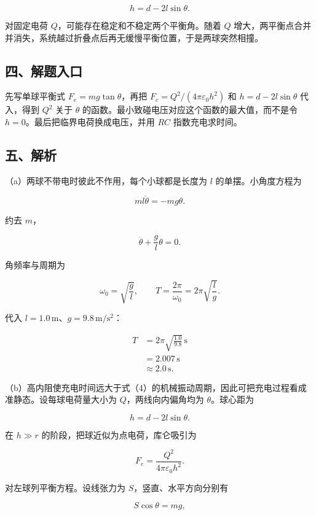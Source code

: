 \documentclass[12pt,a4paper,UTF8]{ctexart}
\begin{document}
\[
h=d-2l\sin\theta.
\]

对固定电荷 \(Q\)，可能存在稳定和不稳定两个平衡角。随着 \(Q\)
增大，两平衡点合并并消失，系统越过折叠点后再无缓慢平衡位置，于是两球突然相撞。

\subsection{四、解题入口}\label{ux56dbux89e3ux9898ux5165ux53e3-5}

先写单球平衡式 \(F_e=mg\tan\theta\)，再把
\(F_e=Q^2/(4\pi\varepsilon_0h^2)\) 和 \(h=d-2l\sin\theta\) 代入，得到
\(Q^2\) 关于 \(\theta\)
的函数。最小致碰电压对应这个函数的最大值，而不是令
\(h=0\)。最后把临界电荷换成电压，并用 \(RC\) 指数充电求时间。

\subsection{五、解析}\label{ux4e94ux89e3ux6790-5}

（a）两球不带电时彼此不作用，每个小球都是长度为 \(l\)
的单摆。小角度方程为

\[
m l\ddot\theta=-mg\theta. \tag{1}
\]

约去 \(m\)，

\[
\ddot\theta+\frac gl\theta=0. \tag{2}
\]

角频率与周期为

\[
\omega_0=\sqrt{\frac gl},
\qquad
T=\frac{2\pi}{\omega_0}=2\pi\sqrt{\frac lg}. \tag{3}
\]

代入 \(l=1.0\,\mathrm m\)、\(g=9.8\,\mathrm{m/s^2}\)：

\[
\begin{aligned}
T
&=2\pi\sqrt{\frac{1.0}{9.8}}\,\mathrm s\\
&=2.007\,\mathrm s\\
&\approx\boxed{2.0\,\mathrm s}.
\end{aligned} \tag{4}
\]

（b）高内阻使充电时间远大于式（4）的机械振动周期，因此可把充电过程看成准静态。设每球电荷量大小为
\(Q\)，两线向内偏角均为 \(\theta\)。球心距为

\[
h=d-2l\sin\theta. \tag{5}
\]

在 \(h\gg r\) 的阶段，把球近似为点电荷，库仑吸引为

\[
F_e=\frac{Q^2}{4\pi\varepsilon_0h^2}. \tag{6}
\]

对左球列平衡方程。设线张力为 \(S\)，竖直、水平方向分别有

\[
S\cos\theta=mg, \tag{7}
\]
\end{document}
